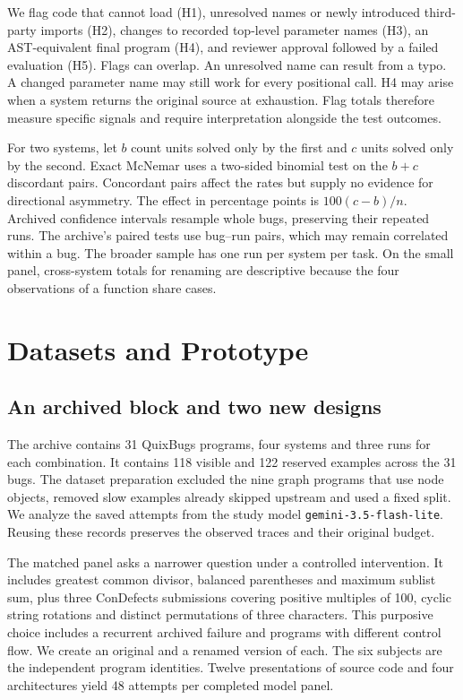 \documentclass[conference]{IEEEtran}
\begin{document}
We flag code that cannot load (H1), unresolved names or newly introduced third-party imports (H2), changes to recorded top-level parameter names (H3), an AST-equivalent final program (H4), and reviewer approval followed by a failed evaluation (H5). Flags can overlap. An unresolved name can result from a typo. A changed parameter name may still work for every positional call. H4 may arise when a system returns the original source at exhaustion. Flag totals therefore measure specific signals and require interpretation alongside the test outcomes.

For two systems, let $b$ count units solved only by the first and $c$ units solved only by the second. Exact McNemar uses a two-sided binomial test on the $b+c$ discordant pairs. Concordant pairs affect the rates but supply no evidence for directional asymmetry. The effect in percentage points is $100(c-b)/n$. Archived confidence intervals resample whole bugs, preserving their repeated runs. The archive's paired tests use bug--run pairs, which may remain correlated within a bug. The broader sample has one run per system per task. On the small panel, cross-system totals for renaming are descriptive because the four observations of a function share cases.


\section{Datasets and Prototype}
\subsection{An archived block and two new designs}
The archive contains 31 QuixBugs programs, four systems and three runs for each combination. It contains 118 visible and 122 reserved examples across the 31 bugs. The dataset preparation excluded the nine graph programs that use node objects, removed slow examples already skipped upstream and used a fixed split. We analyze the saved attempts from the study model \texttt{gemini-3.5-flash-lite}. Reusing these records preserves the observed traces and their original budget.

The matched panel asks a narrower question under a controlled intervention. It includes greatest common divisor, balanced parentheses and maximum sublist sum, plus three ConDefects submissions covering positive multiples of 100, cyclic string rotations and distinct permutations of three characters. This purposive choice includes a recurrent archived failure and programs with different control flow. We create an original and a renamed version of each. The six subjects are the independent program identities. Twelve presentations of source code and four architectures yield 48 attempts per completed model panel.
\end{document}
